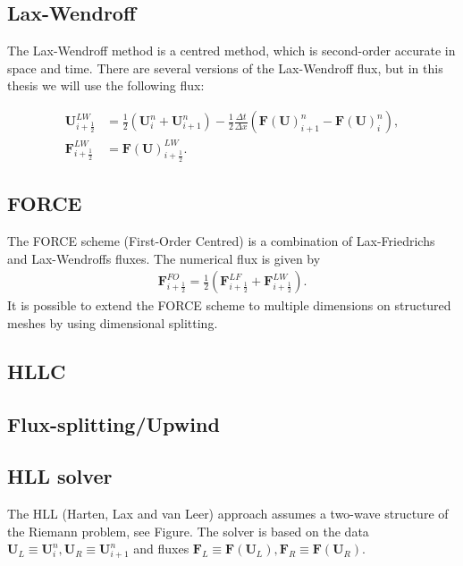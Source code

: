 \subsection{Lax-Wendroff}
The Lax-Wendroff method is a centred method, which is second-order accurate in space and time.
There are several versions of the Lax-Wendroff flux, but in this thesis we will use the following flux:

\begin{equation}
    \begin{aligned}
        \mathbf{U}_{i+ \frac{1}{2}}^{LW} &= \frac{1}{2} \left( \mathbf{U}_{i}^n + \mathbf{U}_{i+1}^n  \right) - \frac{1}{2} \frac{\Delta t}{\Delta x} \left( {\mathbf{F}(\mathbf{U})}_{i+1}^n - {\mathbf{F}(\mathbf{U})}_{i}^n \right), \\
        \mathbf{F}_{i+\frac{1}{2}}^{LW} &= {{\mathbf{F}(\mathbf{U})}_{i+ \frac{1}{2}}^{LW}}.
    \end{aligned}
\end{equation}




\subsection{FORCE}
The FORCE scheme (First-Order Centred) is a combination of Lax-Friedrichs and Lax-Wendroffs fluxes.
The numerical flux is given by
\begin{align*}
    \mathbf{F}_{i+ \frac{1}{2}}^{FO} = \frac{1}{2} \left( \mathbf{F}_{i+ \frac{1}{2}}^{LF} + \mathbf{F}_{i + \frac{1}{2}}^{LW}  \right).
\end{align*}
It is possible to extend the FORCE scheme to multiple dimensions on structured meshes by using dimensional splitting.

\subsection{HLLC}

\subsection{Flux-splitting/Upwind}

\subsection{HLL solver}
The HLL (Harten, Lax and van Leer) approach assumes a two-wave structure of the Riemann problem, see Figure.
The solver is based on the data $\mathbf{U}_L \equiv \mathbf{U}_i^n, \mathbf{U}_R \equiv \mathbf{U}_{i+1}^n$ and fluxes $\mathbf{F}_L \equiv \mathbf{F}(\mathbf{U}_L), \mathbf{F}_R \equiv \mathbf{F}(\mathbf{U}_R)$.

